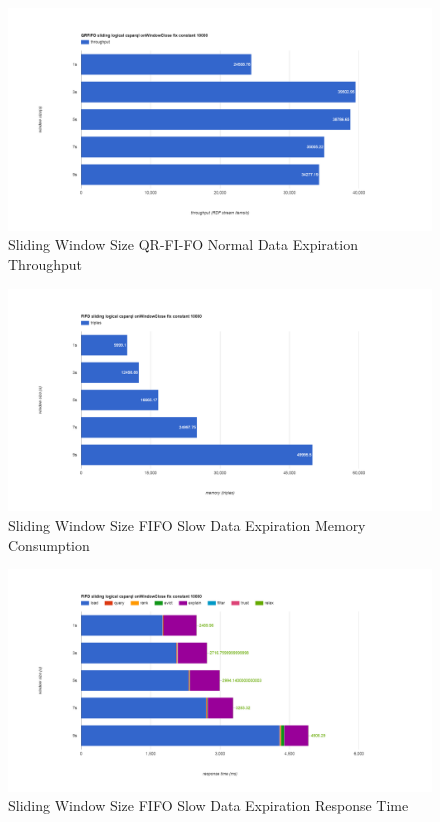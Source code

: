\begin{figure}[!htbp]
    \centering
    \includegraphics[width=\textwidth]{img/app3-slide-ws-qrfifo-normal-t.png}
    \caption{Sliding Window Size QR-FI-FO Normal Data Expiration Throughput}
\end{figure}
\begin{figure}[!htbp]
    \centering
    \includegraphics[width=\textwidth]{img/app3-slide-ws-fifo-slow-m.png}
    \caption{Sliding Window Size FIFO Slow Data Expiration Memory Consumption}
\end{figure}
\begin{figure}[!htbp]
    \centering
    \includegraphics[width=\textwidth]{img/app3-slide-ws-fifo-slow-r.png}
    \caption{Sliding Window Size FIFO Slow Data Expiration Response Time}
\end{figure}
